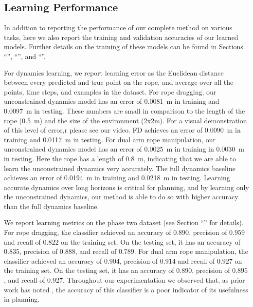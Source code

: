 \subsection{Learning Performance}
In addition to reporting the performance of our complete method on various tasks, here we also report the training and validation accuracies of our learned models. Further details on the training of these models can be found in Sections ``'', ``'', and ``''.

For dynamics learning, we report learning error as the Euclidean distance between every predicted and true point on the rope, and average over all the points, time steps, and examples in the dataset. For rope dragging, our unconstrained dynamics model has an error of \SI{0.0081}{\meter} in training and \SI{0.0097}{\meter} in testing. These numbers are small in comparison to the length of the rope (\SI{0.5}{\meter}) and the size of the environment (2x2m). For a visual demonstration of this level of error,r please see our video. FD achieves an error of \SI{0.0090}{\meter} in training and \SI{0.0117}{\meter} in testing. For dual arm rope manipulation, our unconstrained dynamics model has an error of \SI{0.0025}{\meter} in training in \SI{0.0030}{\meter} in testing. Here the rope has a length of \SI{0.8}{\meter}, indicating that we are able to learn the unconstrained dynamics very accurately. The full dynamics baseline achieves an error of \SI{0.0194}{\meter} in training and \SI{0.0218}{\meter} in testing. Learning accurate dynamics over long horizons is critical for planning, and by learning only the unconstrained dynamics, our method is able to do so with higher accuracy than the full dynamics baseline.

We report learning metrics on the phase two dataset (see Section ``'' for details). For rope dragging, the classifier achieved an accuracy of $0.890$, precision of $0.959$ and recall of $0.822$ on the training set. On the testing set, it has an accuracy of $0.835$, precision of $0.888$, and recall of $0.789$. For dual arm rope manipulation, the classifier achieved an accuracy of $0.904$, precision of $0.914$ and recall of $0.927$ on the training set. On the testing set, it has an accuracy of $0.890$, precision of $0.895$, and recall of $0.927$. Throughout our experimentation we observed that, as prior work has noted \cite{McConachie2020}, the accuracy of this classifier is a poor indicator of its usefulness in planning.

